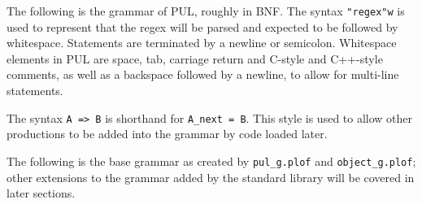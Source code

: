 The following is the grammar of PUL, roughly in BNF. The syntax \texttt{"regex"w} is used to represent that the regex will be parsed and expected to be followed by whitespace. Statements are terminated by a newline or semicolon. Whitespace elements in PUL are space, tab, carriage return and C-style and C++-style comments, as well as a backspace followed by a newline, to allow for multi-line statements.

The syntax \texttt{A => B} is shorthand for \texttt{A\_next = B}. This style is used to allow other productions to be added into the grammar by code loaded later.

The following is the base grammar as created by \texttt{pul\_g.plof} and \texttt{object\_g.plof}; other extensions to the grammar added by the standard library will be covered in later sections.



